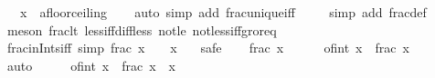 \begin{isabellebody}
\ \ \ x\ {\isacharcolon}{\kern0pt}{\isacharcolon}{\kern0pt}\ {\isachardoublequoteopen}{\isacharprime}{\kern0pt}a{\isacharcolon}{\kern0pt}{\isacharcolon}{\kern0pt}floor{\isacharunderscore}{\kern0pt}ceiling{\isachardoublequoteclose}\isanewline
%
\isadelimproof
\ \ %
\endisadelimproof
%
\isatagproof
{}\isamarkupfalse%
\ {\isacharparenleft}{\kern0pt}auto\ simp\ add{\isacharcolon}{\kern0pt}\ frac{\isacharunderscore}{\kern0pt}unique{\isacharunderscore}{\kern0pt}iff{\isacharparenright}{\kern0pt}\isanewline
\ \ \ \isamarkupfalse%
\ {\isacharparenleft}{\kern0pt}simp\ add{\isacharcolon}{\kern0pt}\ frac{\isacharunderscore}{\kern0pt}def{\isacharparenright}{\kern0pt}\isanewline
\ \ \isamarkupfalse%
\ {\isacharparenleft}{\kern0pt}meson\ frac{\isacharunderscore}{\kern0pt}lt{\isacharunderscore}{\kern0pt}{}\ less{\isacharunderscore}{\kern0pt}iff{\isacharunderscore}{\kern0pt}diff{\isacharunderscore}{\kern0pt}less{\isacharunderscore}{\kern0pt}{}\ not{\isacharunderscore}{\kern0pt}le\ not{\isacharunderscore}{\kern0pt}less{\isacharunderscore}{\kern0pt}iff{\isacharunderscore}{\kern0pt}gr{\isacharunderscore}{\kern0pt}or{\isacharunderscore}{\kern0pt}eq{\isacharparenright}{\kern0pt}\isanewline
\ \ \isamarkupfalse%
%
\endisatagproof
{\isafoldproof}%
%
\isadelimproof
\isanewline
%
\endisadelimproof
\isanewline
{}\isamarkupfalse%
\ frac{\isacharunderscore}{\kern0pt}in{\isacharunderscore}{\kern0pt}Ints{\isacharunderscore}{\kern0pt}iff\ {\isacharbrackleft}{\kern0pt}simp{\isacharbrackright}{\kern0pt}{\isacharcolon}{\kern0pt}\ {\isachardoublequoteopen}frac\ x\ {\isasymin}\ {\isasymint}\ {\isasymlongleftrightarrow}\ x\ {\isasymin}\ {\isasymint}{\isachardoublequoteclose}\isanewline
%
\isadelimproof
%
\endisadelimproof
%
\isatagproof
{}\isamarkupfalse%
\ safe\isanewline
\ \ \isamarkupfalse%
\ {\isachardoublequoteopen}frac\ x\ {\isasymin}\ {\isasymint}{\isachardoublequoteclose}\isanewline
\ \ \isamarkupfalse%
\ {\isachardoublequoteopen}of{\isacharunderscore}{\kern0pt}int\ {\isasymlfloor}x{\isasymrfloor}\ {\isacharplus}{\kern0pt}\ frac\ x\ {\isasymin}\ {\isasymint}{\isachardoublequoteclose}\ \isamarkupfalse%
\ auto\isanewline
\ \ \isamarkupfalse%
\ \isamarkupfalse%
\ {\isachardoublequoteopen}of{\isacharunderscore}{\kern0pt}int\ {\isasymlfloor}x{\isasymrfloor}\ {\isacharplus}{\kern0pt}\ frac\ x\ {\isacharequal}{\kern0pt}\ x{\isachardoublequoteclose}\ \isamarkupfalse%

\end{isabellebody}
